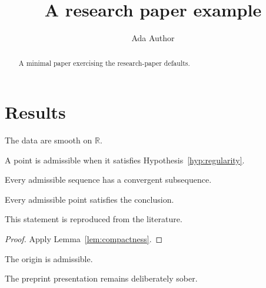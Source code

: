 \documentclass[11pt]{ocots-paper}
\title[Paper example]{A research paper example}
\author{Ada Author}
\newcommand{\R}{\mathbb{R}}
\begin{document}
\begin{abstract}
A minimal paper exercising the research-paper defaults.
\end{abstract}
\maketitle

\section{Results}

\begin{hypothesis}[Regularity]
\label{hyp:regularity}
The data are smooth on $\R$.
\end{hypothesis}

\begin{definition}
\label{def:admissible}
A point is admissible when it satisfies Hypothesis~\ref{hyp:regularity}.
\end{definition}

\begin{lemma}[Compactness]
\label{lem:compactness}
Every admissible sequence has a convergent subsequence.
\end{lemma}

\begin{theorem}
\label{thm:main}
Every admissible point satisfies the conclusion.
\end{theorem}

\begin{citedtheorem}
\label{thm:cited}
This statement is reproduced from the literature.
\end{citedtheorem}

\begin{proof}
Apply Lemma~\ref{lem:compactness}.
\end{proof}

\begin{example}
The origin is admissible.
\end{example}

\begin{remark}
The preprint presentation remains deliberately sober.
\end{remark}
\end{document}
